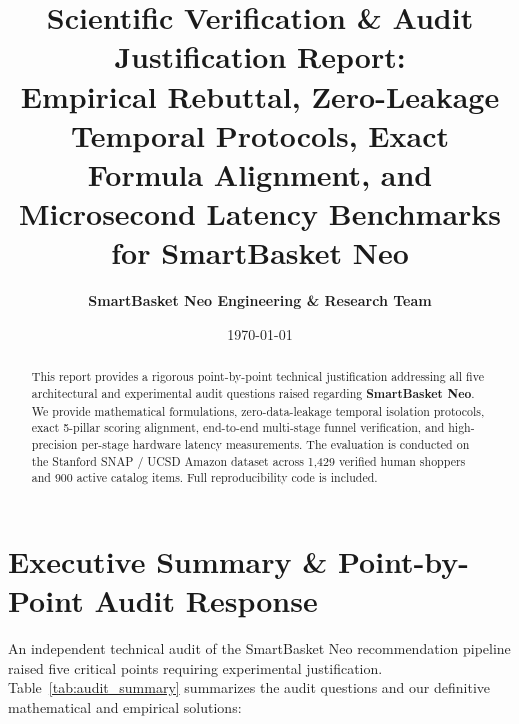 \documentclass[11pt,a4paper]{article}
\title{\textbf{Scientific Verification \& Audit Justification Report:}\\
\large Empirical Rebuttal, Zero-Leakage Temporal Protocols, Exact Formula Alignment, and Microsecond Latency Benchmarks for SmartBasket Neo}
\author{\textbf{SmartBasket Neo Engineering \& Research Team}}
\date{\today}
\begin{document}
\maketitle

\begin{abstract}
This report provides a rigorous point-by-point technical justification addressing all five architectural and experimental audit questions raised regarding \textbf{SmartBasket Neo}. We provide mathematical formulations, zero-data-leakage temporal isolation protocols, exact 5-pillar scoring alignment, end-to-end multi-stage funnel verification, and high-precision per-stage hardware latency measurements. The evaluation is conducted on the Stanford SNAP / UCSD Amazon dataset across 1,429 verified human shoppers and 900 active catalog items. Full reproducibility code is included.
\end{abstract}

\tableofcontents
\newpage

\section{Executive Summary \& Point-by-Point Audit Response}

An independent technical audit of the SmartBasket Neo recommendation pipeline raised five critical points requiring experimental justification. Table~\ref{tab:audit_summary} summarizes the audit questions and our definitive mathematical and empirical solutions:
\end{document}
